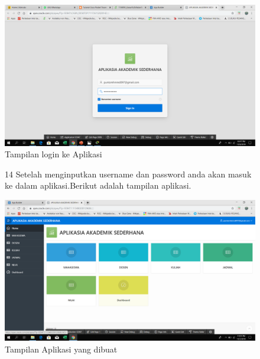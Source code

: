 \begin{enumerate}
\begin{figure}[!htbp]
    \begin{center}
    \includegraphics[scale=0.2]{figures/34.png}
     \caption{Tampilan login ke Aplikasi}
    \end{center}   
    \end{figure}

\begin{figure}[!htbp]
\item[14]Setelah menginputkan username dan password anda akan masuk ke dalam aplikasi.Berikut adalah tampilan aplikasi.

    \begin{center}
    \includegraphics[scale=0.2]{figures/28.png}
     \caption{Tampilan Aplikasi yang dibuat}
    \end{center}   
    \end{figure}

\end{enumerate}


